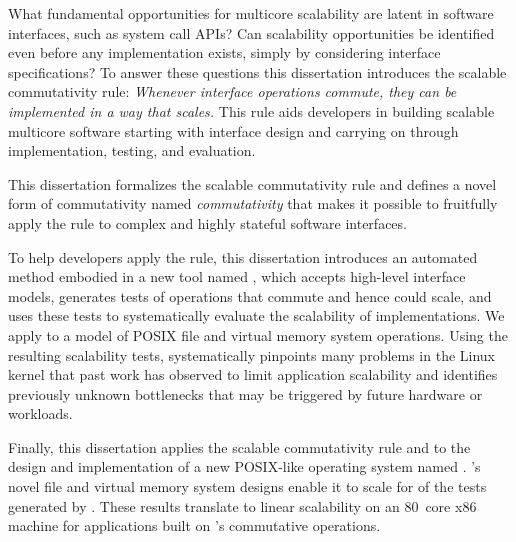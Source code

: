 What fundamental opportunities for multicore scalability are latent in
software interfaces, such as system call APIs? Can scalability
opportunities be identified even before any implementation exists,
simply by considering interface specifications?
To answer these
questions this dissertation introduces the scalable commutativity rule:
\emph{Whenever interface operations commute,
they can be implemented in a way that scales.}
This rule aids developers in building scalable multicore software
starting with interface design and
carrying on through implementation, testing, and evaluation.

This dissertation formalizes the scalable commutativity rule and
defines a novel form of commutativity named \emph{\SIM commutativity}
that makes it possible to fruitfully apply the rule to complex and
highly stateful software interfaces.

To help developers apply the rule, this dissertation introduces an
automated method embodied in a new tool named \tool, which accepts
high-level interface models, generates tests of operations that
commute and hence could scale, and uses these tests to systematically
evaluate the scalability of implementations.
%
We apply \tool to a model of  POSIX file and
virtual memory system operations.
%
Using the resulting  scalability tests, \tool
systematically pinpoints many problems in the Linux kernel that past
work has observed to limit application scalability and identifies
previously unknown bottlenecks that may be triggered by future
hardware or workloads.

Finally, this dissertation applies the scalable commutativity rule and
\tool to the design and implementation of a new POSIX-like operating
system named \sys.
%
\sys's novel file and virtual memory system designs enable it to scale
for  of
the tests generated by \tool.
%
These results translate to linear scalability on an 80~core x86
machine for applications built on \sys's commutative operations.
